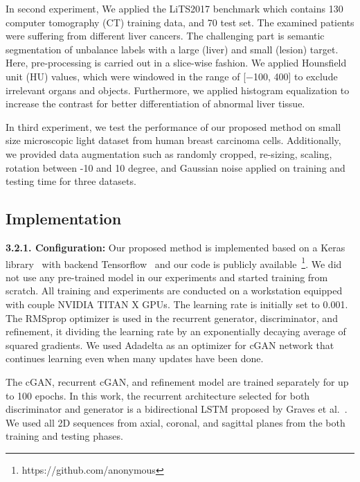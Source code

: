 \documentclass[10pt,twocolumn,letterpaper]{article}
\begin{document}
In second experiment, We applied the LiTS2017 benchmark which contains 130 computer tomography (CT) training data, and 70 test set. The examined patients were suffering from different liver cancers. The challenging part is semantic segmentation of unbalance labels with a large (liver) and small (lesion) target. Here, pre-processing is carried out in a slice-wise fashion. We applied Hounsfield unit (HU) values, which were windowed in the range of [−100, 400] to exclude irrelevant organs and objects. Furthermore, we applied histogram equalization to increase the contrast for better differentiation of abnormal liver tissue.

In third experiment, we test the performance of our proposed method on small size microscopic light dataset from human breast carcinoma cells. %
Additionally, we provided data augmentation such as randomly cropped, re-sizing, scaling, rotation between -10 and 10 degree, and Gaussian noise applied on training and testing time for three datasets.

\subsection{Implementation}\textbf{3.2.1. Configuration:} Our proposed method is implemented based on a Keras library~\cite{chollet2015keras} with backend Tensorflow~\cite{abadi2016tensorflow} and our code is publicly available~\footnote{https://github.com/anonymous}. We did not use any pre-trained model in our experiments and started training from scratch. All training and experiments are conducted on a workstation equipped with couple NVIDIA TITAN X GPUs. The learning rate is initially set to 0.001. The RMSprop optimizer is used in the recurrent generator, discriminator, and refinement, it dividing the learning rate by an exponentially decaying average of squared gradients. We used Adadelta as an optimizer for cGAN network that continues learning even when many updates have been done.

The cGAN, recurrent cGAN, and refinement model are trained separately for up to 100 epochs. In this work, the recurrent architecture selected for both discriminator and generator is a bidirectional LSTM proposed by Graves et al.~\cite{graves2005framewise}. We used all 2D sequences from axial, coronal, and sagittal planes from the both training and testing phases.
\end{document}
